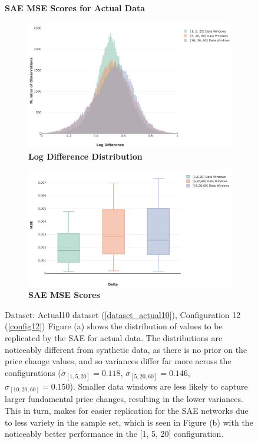 \documentclass[a4paper,11pt,oneside]{article}
\theoremstyle{plain}
\theoremstyle{definition}
\begin{document}
\begin{figure}[H]
	\centering
	\textbf{SAE MSE Scores for Actual Data}
	\begin{subfigure}{.5\textwidth}
		\centering 
		\includegraphics[scale=0.25]{images/results/data/actual_aggregate_dist.png}
		\caption{\textbf{Log Difference Distribution}
			\newline }
		\label{figure-actual_aggregate_dist}
	\end{subfigure}%
	\begin{subfigure}{.5\textwidth}
		\centering 
		\includegraphics[scale=0.26]{images/results/data/actual_aggregation_mse.png}
		\caption{\textbf{SAE MSE Scores} 
			\newline }
		\label{figure-actual_aggregation_mse}
	\end{subfigure}
	\caption[SAE MSE Scores for Actual Data]{Dataset: Actual10 dataset (\ref{dataset_actual10}), Configuration 12 (\ref{config12})
		\newline Figure (a) shows the distribution of values to be replicated by the SAE for actual data. The distributions are noticeably different from synthetic data, as there is no prior on the price change values, and so variances differ far more across the configurations ($\sigma_{[1,5,20]} = 0.118$, $\sigma_{[5,20,60]} = 0.146$, $\sigma_{[10,20,60]} = 0.150$). Smaller data windows are less likely to capture larger fundamental price changes, resulting in the lower variances. This in turn, makes for easier replication for the SAE networks due to less variety in the sample set, which is seen in Figure (b) with the noticeably better performance in the [1, 5, 20] configuration.   }
	\label{fig:data_sae_actual}
\end{figure}
\end{document}
